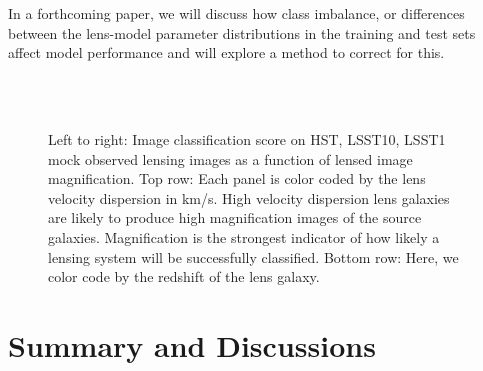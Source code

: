 \documentclass{emulateapj}
\begin{document}
In a forthcoming paper, we will discuss how class imbalance, or
differences between the lens-model parameter distributions in the
training and test sets affect model performance and will explore a
method to correct for this.
\begin{figure*}[t]
  \centering 
  \mbox{
    \hfill
    \hfill
  }\\ 
  \mbox{
    \hfill
    \hfill
  }\\ 
\caption{Left to right: Image classification score on HST, LSST10,
  LSST1 mock observed lensing images as a function of lensed image
  magnification.  Top row: Each panel is color coded by the lens
  velocity dispersion in km/s.  High velocity dispersion lens galaxies
  are likely to produce high magnification images of the source
  galaxies.  Magnification is the strongest indicator of how likely a
  lensing system will be successfully classified.  Bottom row: Here,
  we color code by the redshift of the lens galaxy.}\vspace{10pt}
\label{fig:scorevslensparams}
\end{figure*}

\section{Summary and Discussions}
\label{sec:conclusions}
\end{document}
